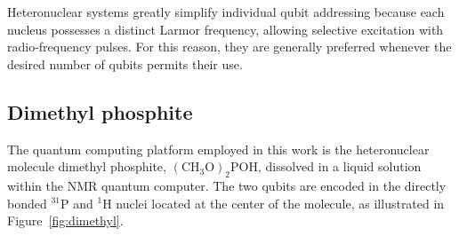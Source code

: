 Heteronuclear systems greatly simplify individual qubit addressing because each nucleus possesses a distinct Larmor frequency, allowing selective excitation with radio-frequency pulses. For this reason, they are generally preferred whenever the desired number of qubits permits their use.

\subsection{Dimethyl phosphite}
\label{subsec:dimethyl_phosphite}

The quantum computing platform employed in this work is the heteronuclear molecule dimethyl phosphite, \(\mathrm{{(CH_3O)}_2POH}\), dissolved in a liquid solution within the NMR quantum computer. The two qubits are encoded in the directly bonded \({}^{31}\mathrm{P}\) and \({}^{1}\mathrm{H}\) nuclei located at the center of the molecule, as illustrated in Figure~\ref{fig:dimethyl}.


